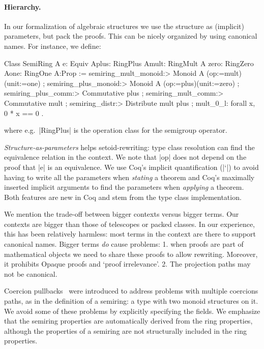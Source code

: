\documentclass[a4paper,10pt]{llncs}
\begin{document}
\paragraph{Hierarchy.}\label{hierarchy}
In our formalization of algebraic structures we use the structure as (implicit) parameters, but
pack the proofs. This can be nicely organized by using canonical names. For instance, we define:
\begin{code}
Class SemiRing A {e: Equiv A}{plus: RingPlus A}{mult: RingMult A}
                 {zero: RingZero A}{one: RingOne A}:Prop :=
  { semiring_mult_monoid:> Monoid A (op:=mult)(unit:=one)
  ; semiring_plus_monoid:> Monoid A (op:=plus)(unit:=zero)
  ; semiring_plus_comm:> Commutative plus
  ; semiring_mult_comm:> Commutative mult
  ; semiring_distr:> Distribute mult plus
  ; mult_0_l: forall x, 0 * x == 0 }.
\end{code}
where e.g.\ |RingPlus| is the operation class for the semigroup operator.

\emph{Structure-as-parameters} helps setoid-rewriting: type class resolution
can find the equivalence relation in the context.
We note that |op| does not depend on the proof that |e| is an equivalence. We use Coq's implicit
quantification (|`{}|) to avoid having to write all the parameters when \emph{stating} a theorem
and Coq's maximally inserted implicit arguments to find the parameters when \emph{applying} a
theorem. Both features are new in Coq and stem from the type class implementation.

We mention the trade-off between bigger contexts versus bigger terms. Our contexts are bigger than
those of telescopes or packed classes. In our experience, this has been relatively harmless: most
terms in the context are there to support canonical names. Bigger terms
\emph{do} cause problems: 1. when proofs are part of mathematical objects we need to share these
proofs to allow rewriting. Moreover, it prohibits Opaque proofs and `proof irrelevance'. 2. The
projection paths may not be canonical.

Coercion pullbacks~\cite{Hints} were introduced to address problems with multiple coercions paths,
as in the definition of a semiring: a type with two monoid structures on it. We avoid some
of these problems by explicitly specifying the fields. We emphasize that the semiring properties are automatically derived from the ring
properties, although the properties of a semiring are not structurally included in the ring
properties.
\end{document}
